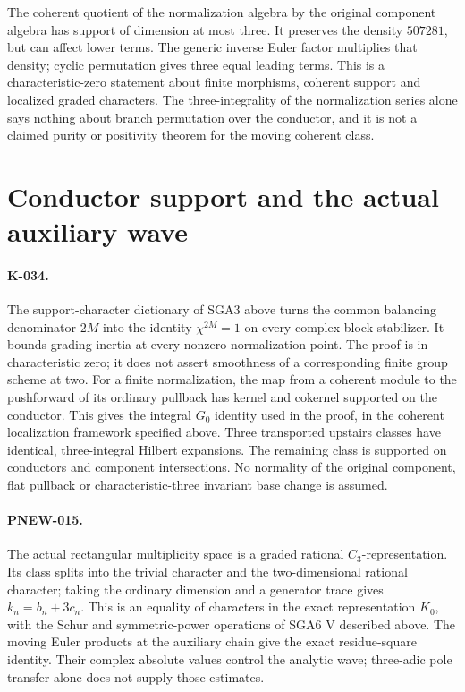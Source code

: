The coherent quotient of the normalization algebra by the original
component algebra has support of dimension at most three. It preserves
the density $507281$, but can affect lower terms. The generic inverse
Euler factor multiplies that density; cyclic permutation gives three
equal leading terms. This is a characteristic-zero statement about
finite morphisms, coherent support and localized graded characters.
The three-integrality of the normalization series alone says nothing
about branch permutation over the conductor, and it is not a claimed
purity or positivity theorem for the moving coherent class.

\section{Conductor support and the actual auxiliary wave}
\paragraph{K-034.}
The support-character dictionary of SGA3 above turns the common
balancing denominator $2M$ into the identity $\chi^{2M}=1$ on every
complex block stabilizer. It bounds grading inertia at every nonzero
normalization point. The proof is in characteristic zero; it does
not assert smoothness of a corresponding finite group scheme at two.
For a finite normalization, the map from a coherent module to the
pushforward of its ordinary pullback has kernel and cokernel supported
on the conductor. This gives the integral $G_0$ identity used in the
proof, in the coherent localization framework specified above.
Three transported upstairs classes have identical, three-integral
Hilbert expansions. The remaining class is supported on conductors
and component intersections. No normality of the original component,
flat pullback or characteristic-three invariant base change is assumed.

\paragraph{PNEW-015.}
The actual rectangular multiplicity space is a graded rational
$C_3$-representation. Its class splits into the trivial character and
the two-dimensional rational character; taking the ordinary dimension
and a generator trace gives $k_n=b_n+3c_n$. This is an equality of
characters in the exact representation $K_0$, with the Schur and
symmetric-power operations of SGA6 V described above. The moving
Euler products at the auxiliary chain give the exact residue-square
identity. Their complex absolute values control the analytic wave;
three-adic pole transfer alone does not supply those estimates.


